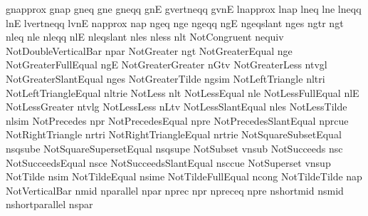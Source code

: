  gnapprox               gnap
 gneq                   gne
 gneqq                  gnE
 gvertneqq              gvnE
 lnapprox               lnap
 lneq                   lne
 lneqq                  lnE
 lvertneqq              lvnE
 napprox                nap
 ngeq                   nge
 ngeqq                  ngE
 ngeqslant              nges
 ngtr                   ngt
 nleq                   nle
 nleqq                  nlE
 nleqslant              nles
 nless                  nlt
 NotCongruent           nequiv
 NotDoubleVerticalBar   npar
 NotGreater             ngt
 NotGreaterEqual        nge
 NotGreaterFullEqual    ngE
 NotGreaterGreater      nGtv
 NotGreaterLess         ntvgl
 NotGreaterSlantEqual   nges
 NotGreaterTilde        ngsim
 NotLeftTriangle        nltri
 NotLeftTriangleEqual   nltrie
 NotLess                nlt
 NotLessEqual           nle
 NotLessFullEqual       nlE
 NotLessGreater         ntvlg
 NotLessLess            nLtv
 NotLessSlantEqual      nles
 NotLessTilde           nlsim
 NotPrecedes            npr
 NotPrecedesEqual       npre
 NotPrecedesSlantEqual  nprcue
 NotRightTriangle       nrtri
 NotRightTriangleEqual  nrtrie
 NotSquareSubsetEqual   nsqsube
 NotSquareSupersetEqual nsqsupe
 NotSubset              vnsub
 NotSucceeds            nsc
 NotSucceedsEqual       nsce
 NotSucceedsSlantEqual  nsccue
 NotSuperset            vnsup
 NotTilde               nsim
 NotTildeEqual          nsime
 NotTildeFullEqual      ncong
 NotTildeTilde          nap
 NotVerticalBar         nmid
 nparallel              npar
 nprec                  npr
 npreceq                npre
 nshortmid              nsmid
 nshortparallel         nspar
